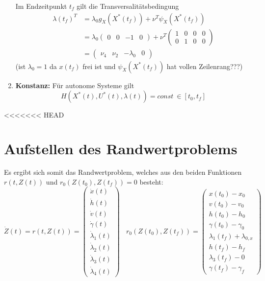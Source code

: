 \begin{enumerate}
Im Endzeitpunkt $t_f$ gilt die Transversalitätsbedingung 
\[\begin{split}
\lambda(t_f)^T &= \lambda_0 g_X(X^{\ast}(t_f)) + \nu^T \psi_X(X^{\ast}(t_f)) \\\
&= \lambda_0 \begin{pmatrix}
0 & 0 & -1 & 0
\end{pmatrix}  + \nu^T \begin{pmatrix}
1 & 0 & 0 & 0 \\
0 & 1 & 0 & 0 
\end{pmatrix}  \\\
&= \begin{pmatrix}
\nu_4 & \nu_2 & -\lambda_0 & 0 
\end{pmatrix}
\end{split}\]
(ist $\lambda_{0} =1$ da $x(t_f)$ frei ist und $\psi_X(X^{\ast}(t_f))$ hat vollen Zeilenrang???) 
%
\item \textbf{Konstanz:} Für autonome Systeme gilt \[H(X^{\ast}(t),U^{\ast}(t), \lambda(t)) = const \ \in [t_0,t_f]\]
\end{enumerate}





<<<<<<< HEAD
\section{Aufstellen des Randwertproblems}
Es ergibt sich somit das Randwertproblem, welches aus den beiden Funktionen $r(t,Z(t))$ und $r_0(Z(t_0),Z(t_f)) = 0$ besteht:
\[\dot{Z}(t) = r(t,Z(t)) = \begin{pmatrix}
\dot{x}(t) \\
\dot{h}(t) \\
\dot{v}(t) \\
\dot{\gamma}(t) \\
\dot{\lambda}_1(t) \\ 
\dot{\lambda}_2(t) \\ 
\dot{\lambda}_3(t) \\ 
\dot{\lambda}_4(t)
\end{pmatrix}  \ \ \ \ r_0(Z(t_0),Z(t_f)) = \begin{pmatrix}
x(t_0) - x_0 \\ 
v(t_0) - v_0 \\ 
h(t_0) - h_0 \\ 
\gamma(t_0) - \gamma_0 \\
\lambda_1(t_f) + \lambda_{0,x} \\ 
h(t_f) - h_f \\ 
\lambda_3(t_f) - 0 \\ 
\gamma(t_f) - \gamma_f
\end{pmatrix}\]

